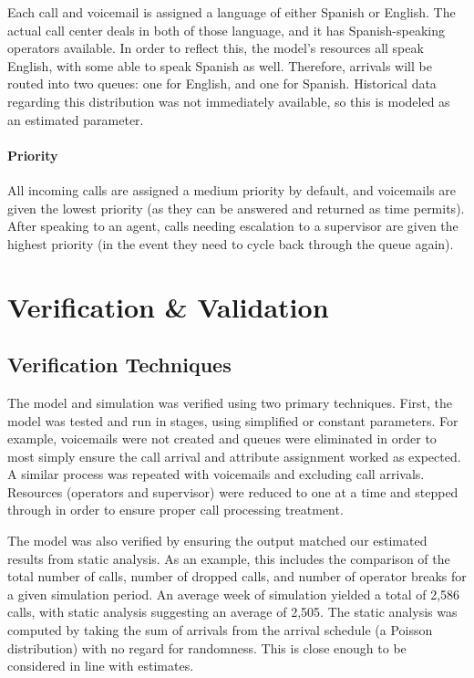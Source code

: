 \documentclass[12pt,twocolumn]{article}
\begin{document}
Each call and voicemail is assigned a language of either Spanish or English.  The actual call center deals in both of those language, and it has Spanish-speaking operators available.  In order to reflect this, the model's resources all speak English, with some able to speak Spanish as well.  Therefore, arrivals will be routed into two queues:  one for English, and one for Spanish.  Historical data regarding this distribution was not immediately available, so this is modeled as an estimated parameter.

	\paragraph{Priority}

All incoming calls are assigned a medium priority by default, and voicemails are given the lowest priority (as they can be answered and returned as time permits).  After speaking to an agent, calls needing escalation to a supervisor are given the highest priority (in the event they need to cycle back through the queue again).


\section{Verification \& Validation}

	\subsection{Verification Techniques}

The model and simulation was verified using two primary techniques.  First, the model was tested and run in stages, using simplified or constant parameters.  For example, voicemails were not created and queues were eliminated in order to most simply ensure the call arrival and attribute assignment worked as expected.  A similar process was repeated with voicemails and excluding call arrivals.  Resources (operators and supervisor) were reduced to one at a time and stepped through in order to ensure proper call processing treatment.  

\par

The model was also verified by ensuring the output matched our estimated results from static analysis.  As an example, this includes the comparison of the total number of calls, number of dropped calls, and number of operator breaks for a given simulation period.  An average week of simulation yielded a total of 2,586 calls, with static analysis suggesting an average of 2,505.  The static analysis was computed by taking the sum of arrivals from the arrival schedule (a Poisson distribution) with no regard for randomness. This is close enough to be considered in line with estimates.
	
\end{document}
